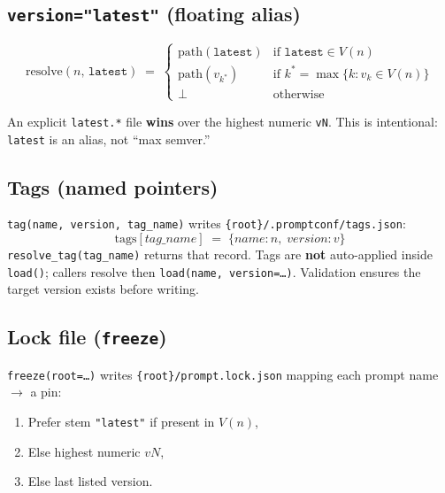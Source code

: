\documentclass[11pt,a4paper]{article}
\newcommand{\code}[1]{\texttt{#1}}
\newcommand{\botperp}{\bot}
\begin{document}
\subsection{\texttt{version="latest"} (floating alias)}

\begin{equation}
  \mathrm{resolve}(n,\, \texttt{latest}) \;=\;
  \begin{cases}
    \mathrm{path}(\texttt{latest})
      & \text{if } \texttt{latest} \in V(n) \\[0.4em]
    \mathrm{path}(v_{k^{*}})
      & \text{if } k^{*} = \max\{k : v_k \in V(n)\} \\[0.4em]
    \botperp
      & \text{otherwise}
  \end{cases}
\end{equation}

An explicit \code{latest.*} file \textbf{wins} over the highest numeric
\code{vN}. This is intentional: \code{latest} is an alias, not
``max semver.''

\subsection{Tags (named pointers)}

\code{tag(name, version, tag\_name)} writes
\code{\{root\}/.promptconf/tags.json}:
\begin{equation}
  \mathrm{tags}[\textit{tag\_name}] \;=\; \{\textit{name}: n,\;
  \textit{version}: v\}
\end{equation}
\code{resolve\_tag(tag\_name)} returns that record. Tags are \textbf{not}
auto-applied inside \code{load()}; callers resolve then
\code{load(name, version=\ldots)}. Validation ensures the target version exists
before writing.

\subsection{Lock file (\texttt{freeze})}

\code{freeze(root=\ldots)} writes \code{\{root\}/prompt.lock.json} mapping each
prompt name $\rightarrow$ a pin:
\begin{enumerate}[leftmargin=*]
  \item Prefer stem \texttt{"latest"} if present in $V(n)$,
  \item Else highest numeric $vN$,
  \item Else last listed version.
\end{enumerate}
\end{document}
